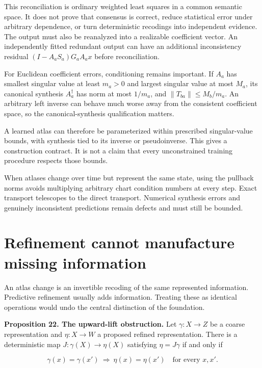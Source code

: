This reconciliation is ordinary weighted least squares in a common
semantic space. It does not prove that consensus is correct, reduce
statistical error under arbitrary dependence, or turn deterministic
recodings into independent evidence. The output must also be reanalyzed
into a realizable coefficient vector. An independently fitted redundant
output can have an additional inconsistency residual
\((I-A_aS_a)G_aA_ax\) before reconciliation.

For Euclidean coefficient errors, conditioning remains important. If
\(A_a\) has smallest singular value at least \(m_a>0\) and largest
singular value at most \(M_a\), its canonical synthesis \(A_a^\dagger\)
has norm at most \(1/m_a\), and \(\|T_{ba}\|\leq M_b/m_a\). An arbitrary
left inverse can behave much worse away from the consistent coefficient
space, so the canonical-synthesis qualification matters.

A learned atlas can therefore be parameterized within prescribed
singular-value bounds, with synthesis tied to its inverse or
pseudoinverse. This gives a construction contract. It is not a claim
that every unconstrained training procedure respects those bounds.

When atlases change over time but represent the same state, using the
pullback norms avoids multiplying arbitrary chart condition numbers at
every step. Exact transport telescopes to the direct transport.
Numerical synthesis errors and genuinely inconsistent predictions remain
defects and must still be bounded.

\section{Refinement cannot manufacture missing information}\label{LSM:refinement-cannot-manufacture-missing-information}

An atlas change is an invertible recoding of the same represented
information. Predictive refinement usually adds information. Treating
these as identical operations would undo the central distinction of the
foundation.

\textbf{Proposition 22. The upward-lift obstruction.} Let
\(\gamma:X\to Z\) be a coarse representation and \(\eta:X\to W\) a
proposed refined representation. There is a deterministic map
\(J:\gamma(X)\to\eta(X)\) satisfying \(\eta=J\gamma\) if and only if

\[
\gamma(x)=\gamma(x')\ \Longrightarrow\ \eta(x)=\eta(x')
\quad\text{for every }x,x'.
\]

